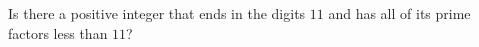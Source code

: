 Is there a positive integer that ends in the digits $11$ and has all of its prime factors less than $11$?
